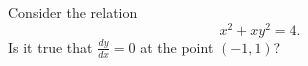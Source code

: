 \documentclass{ximera}
\author{Steven Gubkin}
\begin{document}
\begin{exercise}

Consider the relation
\[
x^2+xy^2 = 4.
\]
Is it true that $\frac{dy}{dx} = 0$ at the point $(-1,1)$?  
\begin{prompt}
  \begin{multipleChoice}
  \end{multipleChoice}
\end{prompt}
\end{exercise}
\end{document}
